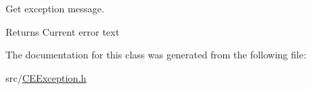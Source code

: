 Get exception message. 

\begin{DoxyReturn}{Returns}
Current error text 
\end{DoxyReturn}


The documentation for this class was generated from the following file:\begin{DoxyCompactItemize}
\item 
src/\hyperlink{CEException_8h}{CEException.h}\end{DoxyCompactItemize}
